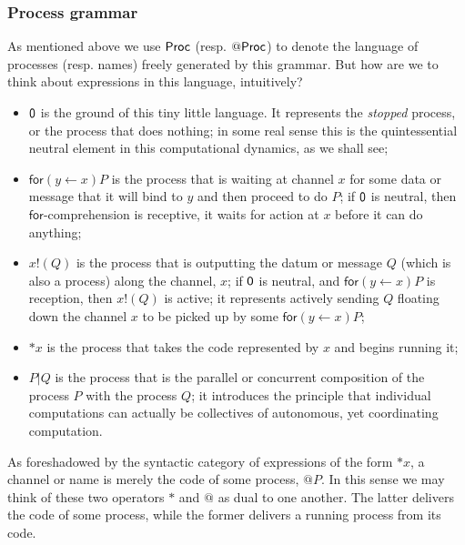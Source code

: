 \subsubsection{Process grammar}\label{subsub:process_grammar}


As mentioned above we use $\mathsf{Proc}$ (resp. $\mathsf{@} \mathsf{Proc}$) to denote the
language of processes (resp. names) freely generated by this
grammar. But how are we to think about expressions in this language,
intuitively?

\begin{itemize}
  \item $\mathsf{0}$ is the ground of this tiny little language. It represents the \emph{stopped} process, or the process that does nothing; in some real sense this is the quintessential neutral element in this computational dynamics, as we shall see;
  \item $\mathsf{for}( y \leftarrow x )P$ is the process that is waiting at channel $x$ for some data or message that it will bind to $y$ and then proceed to do $P$; if $\mathsf{0}$ is neutral, then $\mathsf{for}$-comprehension is receptive, it waits for action at $x$ before it can do anything;
  \item $x\mathsf{!}(Q)$ is the process that is outputting the datum or message $Q$ (which is also a process) along the channel, $x$; if $\mathsf{0}$ is neutral, and $\mathsf{for}( y \leftarrow x )P$ is reception, then $x\mathsf{!}(Q)$ is active; it represents actively sending $Q$ floating down the channel $x$ to be picked up by some $\mathsf{for}( y \leftarrow x )P$;
  \item $\mathsf{*}x$ is the process that takes the code represented by $x$ and begins running it;
  \item $P\mathsf{|}Q$ is the process that is the parallel or concurrent composition of the process $P$ with the process $Q$; it introduces the principle that individual computations can actually be collectives of autonomous, yet coordinating computation.  
\end{itemize}

As foreshadowed by the syntactic category of expressions of the form
$\mathsf{*}x$, a channel or name is merely the code of some process,
$\mathsf{@}P$. In this sense we may think of these two operators
$\mathsf{*}$ and $\mathsf{@}$ as dual to one another. The latter
delivers the code of some process, while the former delivers a running
process from its code.

